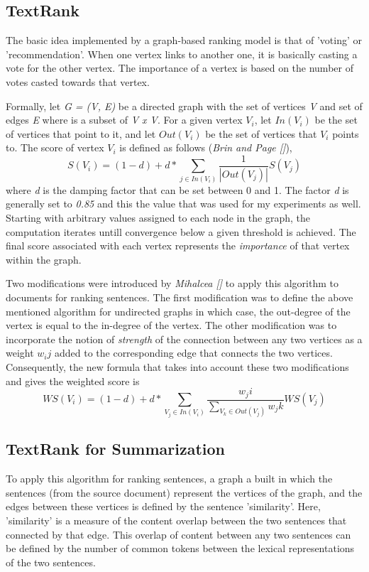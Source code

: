 \subsection*{TextRank}
The basic idea implemented by a graph-based ranking model is that of 'voting' or 'recommendation'.
When one vertex links to another one, it is basically casting a vote for the other vertex.
The importance of a vertex is based on the number of votes casted towards that vertex. 

Formally, let \emph{G = (V, E)} be a directed graph with the set of vertices \emph{V} and set of edges \emph{E} where is a subset of \emph{{V x V}}.
For a given vertex \(V_i\), let \(In(V_i)\) be the set of vertices that point to it, and let \(Out(V_i)\) be the set of vertices that \(V_i\) points to.
The score of vertex \(V_i\) is defined as follows (\emph{Brin and Page []}),
\[S(V_i) = (1 - d) + d * \sum_{j \in In(V_i)} \frac{1}{|Out(V_j)|}S(V_j)\]
where \emph{d} is the damping factor that can be set between 0 and 1.
The factor \emph{d} is generally set to \emph{0.85} and this the value that was used for my experiments as well.
Starting with arbitrary values assigned to each node in the graph, the computation iterates untill convergence below a given threshold is achieved.
The final score associated with each vertex represents the \textit{importance} of that vertex within the graph.

Two modifications were introduced by \emph{Mihalcea []} to apply this algorithm to documents for ranking sentences.
The first modification was to define the above mentioned algorithm for undirected graphs in which case, the out-degree of the vertex is equal to the in-degree of the vertex.
The other modification was to incorporate the notion of \textit{strength} of the connection between any two vertices as a weight \(w_ij\) added to the corresponding edge that connects the two vertices.
Consequently, the new formula that takes into account these two modifications and gives the weighted score is
\[WS(V_i) = (1 - d) + d * \sum_{V_j \in In(V_i)} \frac{w_ji}{\sum_{V_k \in Out(V_j)}w_jk}WS(V_j)\]

\subsection*{TextRank for Summarization}
To apply this algorithm for ranking sentences, a graph a built in which the sentences (from the source document) represent the vertices of the graph, and the edges between these vertices is defined by the sentence 'similarity'.
Here, 'similarity' is a measure of the content overlap between the two sentences that connected by that edge.
This overlap of content between any two sentences can be defined by the number of common tokens between the lexical representations of the two sentences.

